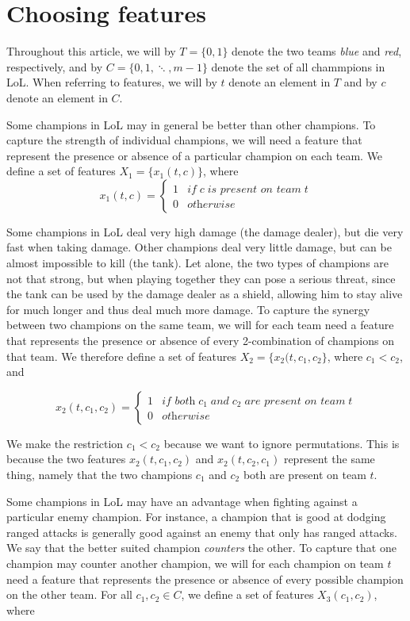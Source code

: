 \section{Choosing features}
\label{sec:choosingfeatures}
Throughout this article, we will by $T = \{0, 1\}$ denote the two teams \textit{blue} and \textit{red}, respectively, and by $C = \{0, 1, \ddots, m-1\}$ denote the set of all chammpions in LoL. When referring to features, we will by $t$ denote an element in $T$ and by $c$ denote an element in $C$.

Some champions in LoL may in general be better than other champions.
To capture the strength of individual champions, we will need a feature that represent the presence or absence of a particular champion on each team.
We define a set of features $X_1 = \{x_1(t, c)\}$, where
\[x_1(t, c) = \begin{cases} 1 & \textit{if} \; c \; \textit{is present on team} \; t \\
						    0 & \textit{otherwise} \end{cases}\]

Some champions in LoL deal very high damage (the damage dealer), but die very fast when taking damage. Other champions deal very little damage, but can be almost impossible to kill (the tank). Let alone, the two types of champions are not that strong, but when playing together they can pose a serious threat, since the tank can be used by the damage dealer as a shield, allowing him to stay alive for much longer and thus deal much more damage.
To capture the synergy between two champions on the same team, we will for each team need a feature that represents the presence or absence of every 2-combination of champions on that team. We therefore define a set of features $X_2 = \{x_2(t, c_1, c_2\}$, where $c_1 < c_2$, and

\[
x_2(t, c_1, c_2) = \begin{cases} 1 & \textit{if both} \; c_1 \; \textit{and} \; c_2 \; \textit{are present on team} \; t \\
                                 0 & \textit{otherwise} \end{cases}
\]

We make the restriction $c_1 < c_2$ because we want to ignore permutations. This is because the two features $x_2(t, c_1, c_2)$ and $x_2(t, c_2, c_1)$ represent the same thing, namely that the two champions $c_1$ and $c_2$ both are present on team $t$.

Some champions in LoL may have an advantage when fighting against a particular enemy champion.
For instance, a champion that is good at dodging ranged attacks is generally good against an enemy that only has ranged attacks.
We say that the better suited champion \textit{counters} the other.
To capture that one champion may counter another champion, we will for each champion on team $t$ need a feature that represents the presence or absence of every possible champion on the other team.
For all $c_1, c_2 \in C$, we define a set of features $X_3(c_1, c_2)$, where

